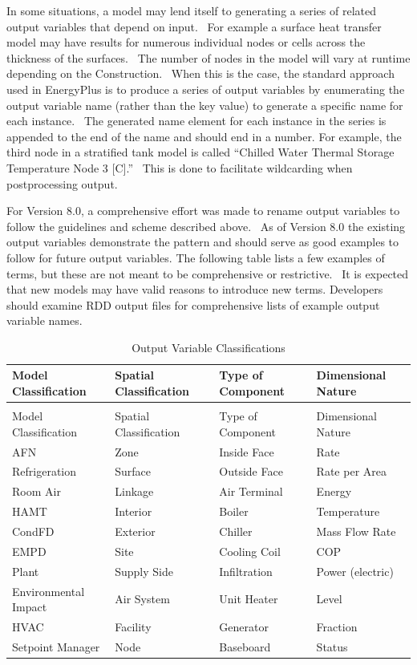 In some situations, a model may lend itself to generating a series of related output variables that depend on input.~ For example a surface heat transfer model may have results for numerous individual nodes or cells across the thickness of the surfaces.~ The number of nodes in the model will vary at runtime depending on the Construction.~ When this is the case, the standard approach used in EnergyPlus is to produce a series of output variables by enumerating the output variable name (rather than the key value) to generate a specific name for each instance.~ The generated name element for each instance in the series is appended to the end of the name and should end in a number. For example, the third node in a stratified tank model is called ``Chilled Water Thermal Storage Temperature Node 3 {[}C{]}.''~ This is done to facilitate wildcarding when postprocessing output.

For Version 8.0, a comprehensive effort was made to rename output variables to follow the guidelines and scheme described above.~ As of Version 8.0 the existing output variables demonstrate the pattern and should serve as good examples to follow for future output variables. The following table lists a few examples of terms, but these are not meant to be comprehensive or restrictive.~ It is expected that new models may have valid reasons to introduce new terms. Developers should examine RDD output files for comprehensive lists of example output variable names.

\begin{longtable}[c]{p{1.5in}p{1.5in}p{1.5in}p{1.5in}}
\caption{Output Variable Classifications \label{table:output-variable-classifications}} \tabularnewline
\toprule
Model Classification & Spatial Classification & Type of Component & Dimensional Nature \tabularnewline
\midrule
\endfirsthead

\caption[]{Output Variable Classifications} \tabularnewline
\toprule
Model Classification & Spatial Classification & Type of Component & Dimensional Nature \tabularnewline
\midrule
\endhead

AFN & Zone & Inside Face & Rate \tabularnewline
Refrigeration & Surface & Outside Face & Rate per Area \tabularnewline
Room Air & Linkage & Air Terminal & Energy \tabularnewline
HAMT & Interior & Boiler & Temperature \tabularnewline
CondFD & Exterior & Chiller & Mass Flow Rate \tabularnewline
EMPD & Site & Cooling Coil & COP \tabularnewline
Plant & Supply Side & Infiltration & Power (electric) \tabularnewline
Environmental Impact & Air System & Unit Heater & Level \tabularnewline
HVAC & Facility & Generator & Fraction \tabularnewline
Setpoint Manager & Node & Baseboard & Status \tabularnewline
\bottomrule
\end{longtable}

